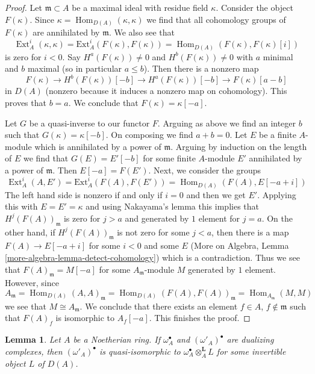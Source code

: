 \documentclass{stacks-project}
\theoremstyle{plain}
\newtheorem{lemma}[subsection]{Lemma}
\theoremstyle{definition}
\theoremstyle{remark}
\numberwithin{equation}{subsection}
\def\Hom{\mathop{\mathrm{Hom}}\nolimits}
\def\Ext{\mathop{\mathrm{Ext}}\nolimits}
\begin{document}
\begin{proof}
Let $\mathfrak m \subset A$ be a maximal ideal with residue field $\kappa$.
Consider the object $F(\kappa)$. Since
$\kappa = \Hom_{D(A)}(\kappa, \kappa)$ we find that all
cohomology groups of $F(\kappa)$ are annihilated by $\mathfrak m$.
We also see that
$$
\Ext^i_A(\kappa, \kappa) = \text{Ext}^i_A(F(\kappa), F(\kappa))
= \Hom_{D(A)}(F(\kappa), F(\kappa)[i])
$$
is zero for $i < 0$. Say $H^a(F(\kappa)) \not = 0$ and
$H^b(F(\kappa)) \not = 0$ with $a$ minimal and $b$ maximal
(so in particular $a \leq b$). Then there is a nonzero map
$$
F(\kappa) \to H^b(F(\kappa))[-b] \to H^a(F(\kappa))[-b]
\to F(\kappa)[a - b]
$$
in $D(A)$ (nonzero because it induces a nonzero map on cohomology).
This proves that $b = a$. We conclude that $F(\kappa) = \kappa[-a]$.

\medskip\noindent
Let $G$ be a quasi-inverse to our functor $F$. Arguing as above
we find an integer $b$ such that $G(\kappa) = \kappa[-b]$.
On composing we find $a + b = 0$. Let $E$ be a finite $A$-module
which is annihilated by a power of $\mathfrak m$. Arguing by
induction on the length of $E$ we find that $G(E) = E'[-b]$
for some finite $A$-module $E'$ annihilated by a power of
$\mathfrak m$. Then $E[-a] = F(E')$.
Next, we consider the groups
$$
\Ext^i_A(A, E') = \text{Ext}^i_A(F(A), F(E')) =
\Hom_{D(A)}(F(A), E[-a + i])
$$
The left hand side is nonzero if and only if $i = 0$ and then
we get $E'$. Applying this with $E = E' = \kappa$ and using Nakayama's
lemma this implies that $H^j(F(A))_\mathfrak m$ is zero for $j > a$ and
generated by $1$ element for $j = a$. On the other hand, if
$H^j(F(A))_\mathfrak m$ is not zero for some $j < a$, then
there is a map $F(A) \to E[-a + i]$ for some $i < 0$ and some
$E$ (More on Algebra, Lemma \ref{more-algebra-lemma-detect-cohomology})
which is a contradiction.
Thus we see that $F(A)_\mathfrak m = M[-a]$
for some $A_\mathfrak m$-module $M$ generated by $1$ element.
However, since
$$
A_\mathfrak m = \Hom_{D(A)}(A, A)_\mathfrak m =
\Hom_{D(A)}(F(A), F(A))_\mathfrak m = \Hom_{A_\mathfrak m}(M, M)
$$
we see that $M \cong A_\mathfrak m$. We conclude that there exists
an element $f \in A$, $f \not \in \mathfrak m$ such that
$F(A)_f$ is isomorphic to $A_f[-a]$. This finishes the proof.
\end{proof}

\begin{lemma}
\label{lemma-dualizing-unique}
Let $A$ be a Noetherian ring. If $\omega_A^\bullet$ and
$(\omega'_A)^\bullet$ are dualizing complexes, then
$(\omega'_A)^\bullet$ is quasi-isomorphic to
$\omega_A^\bullet \otimes_A^\mathbf{L} L$
for some invertible object $L$ of $D(A)$.
\end{lemma}
\end{document}
